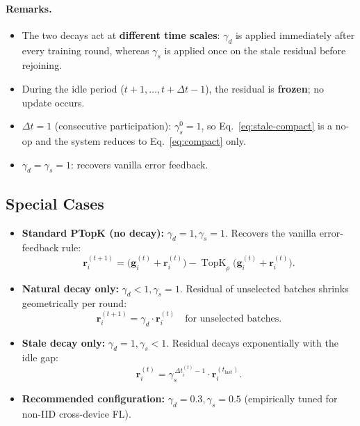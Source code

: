 \documentclass{article}
\begin{document}
\paragraph{Remarks.}
\begin{itemize}
\item The two decays act at \textbf{different time scales}: $\gamma_d$ is applied immediately after every training round, whereas $\gamma_s$ is applied once on the stale residual before rejoining.
\item During the idle period ($t+1, \dots, t+\Delta t-1$), the residual is \textbf{frozen}; no update occurs.
\item $\Delta t = 1$ (consecutive participation): $\gamma_s^0 = 1$, so Eq.~\eqref{eq:stale-compact} is a no-op and the system reduces to Eq.~\eqref{eq:compact} only.
\item $\gamma_d = \gamma_s = 1$: recovers vanilla error feedback.
\end{itemize}

\subsection*{Special Cases}

\begin{itemize}
\item \textbf{Standard PTopK (no decay):} $\gamma_d = 1, \gamma_s = 1$. Recovers the vanilla error-feedback rule:
\begin{equation*}
\mathbf{r}_i^{(t+1)} = \bigl(\mathbf{g}_i^{(t)} + \mathbf{r}_i^{(t)}\bigr) - \operatorname{TopK}_\rho\bigl(\mathbf{g}_i^{(t)} + \mathbf{r}_i^{(t)}\bigr).
\end{equation*}

\item \textbf{Natural decay only:} $\gamma_d < 1, \gamma_s = 1$. Residual of unselected batches shrinks geometrically per round:
\begin{equation*}
\mathbf{r}_i^{(t+1)} = \gamma_d \cdot \mathbf{r}_i^{(t)} \quad \text{for unselected batches}.
\end{equation*}

\item \textbf{Stale decay only:} $\gamma_d = 1, \gamma_s < 1$. Residual decays exponentially with the idle gap:
\begin{equation*}
\mathbf{r}_i^{(t)} = \gamma_s^{\,\Delta t_i^{(t)} - 1} \cdot \mathbf{r}_i^{(t_{\text{last}})}.
\end{equation*}

\item \textbf{Recommended configuration:} $\gamma_d = 0.3, \gamma_s = 0.5$ (empirically tuned for non-IID cross-device FL).
\end{itemize}
\end{document}
